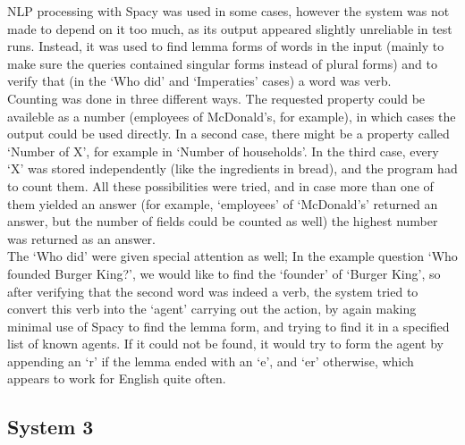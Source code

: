 \documentclass{article}
\begin{document}
NLP processing with Spacy was used in some cases, however the system was not made to depend on it too much, as its output appeared slightly unreliable in test runs. Instead, it was used to find lemma forms of words in the input (mainly to make sure the queries contained singular forms instead of plural forms) and to verify that (in the `Who did' and `Imperaties' cases) a word was verb.\\

Counting was done in three different ways. The requested property could be availeble as a number (employees of McDonald's, for example), in which cases the output could be used directly. In a second case, there might be a property called `Number of X', for example in `Number of households'. In the third case, every `X' was stored independently (like the ingredients in bread), and the program had to count them. All these possibilities were tried, and in case more than one of them yielded an answer (for example, `employees' of `McDonald's' returned an answer, but the number of fields could be counted as well) the highest number was returned as an answer.\\

The `Who did' were given special attention as well; In the example question `Who founded Burger King?', we would like to find the `founder' of `Burger King', so after verifying that the second word was indeed a verb, the system tried to convert this verb into the `agent' carrying out the action, by again making minimal use of Spacy to find the lemma form, and trying to find it in a specified list of known agents. If it could not be found, it would try to form the agent by appending an `r' if the lemma ended with an `e', and `er' otherwise, which appears to work for English quite often.\\

\subsection*{System 3}
\end{document}

